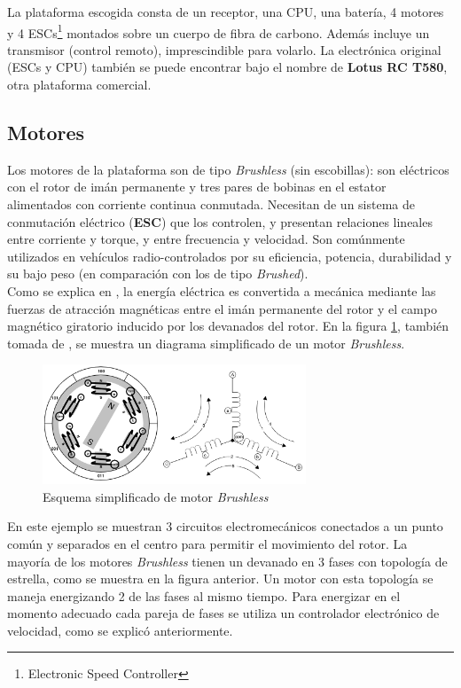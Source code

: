 \documentclass[main]{subfiles}
\begin{document}
La plataforma escogida consta de un receptor, una CPU, una batería, 4 motores y 4 ESCs\footnote{Electronic Speed Controller} montados sobre un cuerpo de fibra de carbono. Además incluye un transmisor (control remoto), imprescindible para volarlo. La electrónica original (ESCs y CPU) también se puede encontrar bajo el nombre de \textbf{Lotus RC T580}, otra plataforma comercial.

\subsection*{Motores}
Los motores de la plataforma son de tipo \emph{Brushless} (sin escobillas): son el\'ectricos con el rotor de im\'an permanente y tres pares de bobinas en el estator alimentados con corriente continua conmutada. Necesitan de un sistema de conmutaci\'on el\'ectrico (\textbf{ESC}) que los controlen, y presentan relaciones lineales entre corriente y torque, y entre frecuencia y velocidad. Son com\'unmente utilizados en veh\'iculos radio-controlados por su eficiencia, potencia, durabilidad y su bajo peso (en comparaci\'on con los de tipo \emph{Brushed}).\\

Como se explica en \cite{bib:brushless}, la energía eléctrica es convertida a mecánica mediante las fuerzas de atracción magnéticas entre el imán permanente del rotor y el campo magnético giratorio inducido por los devanados del rotor. En la figura \ref{fig:brushless}, también tomada de \cite{bib:brushless}, se muestra un diagrama simplificado de un motor \emph{Brushless}.

\begin{figure}[h!]
	\centering
	\includegraphics[width=0.7\textwidth]{./pics_eleccion_hardware/brushless.png}
\vspace{-10pt}
	\caption{Esquema simplificado de motor \emph{Brushless}}
	\label{fig:brushless}
\end{figure}

En este ejemplo se muestran 3 circuitos electromecánicos conectados a un punto común y separados en el centro para permitir el movimiento del rotor. La mayoría de los motores \emph{Brushless} tienen un devanado en 3 fases con topología de estrella, como se muestra en la figura anterior. Un motor con esta topología se maneja energizando 2 de las fases al mismo tiempo. Para energizar en el momento adecuado cada pareja de fases se utiliza un controlador electrónico de velocidad, como se explicó anteriormente.
\end{document}
